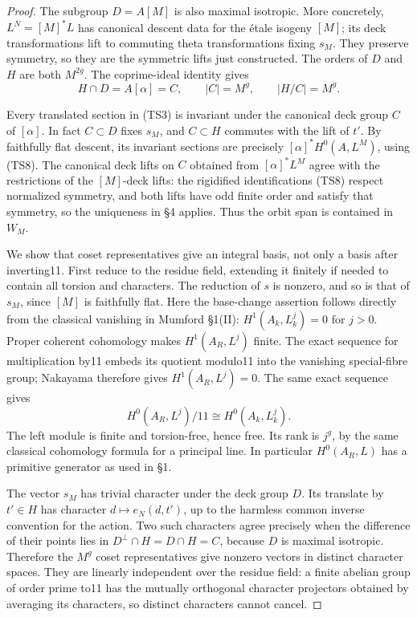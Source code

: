 \begin{proof}
The subgroup \(D=A[M]\) is also maximal isotropic. More concretely, \(L^N=[M]^*L\) has canonical descent data for the étale isogeny \([M]\); its deck transformations lift to commuting theta transformations fixing \(s_M\). They preserve symmetry, so they are the symmetric lifts just constructed. The orders of \(D\) and \(H\) are both \(M^{2g}\). The coprime-ideal identity gives \[
 H\cap D=A[\alpha]=C,\qquad |C|=M^g,
 \qquad |H/C|=M^g.
 \tag{TS10}
\]

Every translated section in (TS3) is invariant under the canonical deck group \(C\) of \([\alpha]\). In fact \(C\subset D\) fixes \(s_M\), and \(C\subset H\) commutes with the lift of \(t'\). By faithfully flat descent, its invariant sections are precisely \([\alpha]^*H^0(A,L^M)\), using (TS8). The canonical deck lifts on \(C\) obtained from \([\alpha]^*L^M\) agree with the restrictions of the \([M]\)-deck lifts: the rigidified identifications (TS8) respect normalized symmetry, and both lifts have odd finite order and satisfy that symmetry, so the uniqueness in §4 applies. Thus the orbit span is contained in \(W_M\).

We show that coset representatives give an integral basis, not only a basis after inverting11. First reduce to the residue field, extending it finitely if needed to contain all torsion and characters. The reduction of \(s\) is nonzero, and so is that of \(s_M\), since \([M]\) is faithfully flat. Here the base-change assertion follows directly from the classical vanishing in Mumford §1(II): \(H^1(A_k,L_k^j)=0\) for \(j>0\). Proper coherent cohomology makes \(H^1(A_R,L^j)\) finite. The exact sequence for multiplication by11 embeds its quotient modulo11 into the vanishing special-fibre group; Nakayama therefore gives \(H^1(A_R,L^j)=0\). The same exact sequence gives \[
 H^0(A_R,L^j)/11\cong H^0(A_k,L_k^j).
 \tag{TS11}
\] The left module is finite and torsion-free, hence free. Its rank is \(j^g\), by the same classical cohomology formula for a principal line. In particular \(H^0(A_R,L)\) has a primitive generator as used in §1.

The vector \(s_M\) has trivial character under the deck group \(D\). Its translate by \(t'\in H\) has character \(d\mapsto e_N(d,t')\), up to the harmless common inverse convention for the action. Two such characters agree precisely when the difference of their points lies in \(D^\perp\cap H=D\cap H=C\), because \(D\) is maximal isotropic. Therefore the \(M^g\) coset representatives give nonzero vectors in distinct character spaces. They are linearly independent over the residue field: a finite abelian group of order prime to11 has the mutually orthogonal character projectors obtained by averaging its characters, so distinct characters cannot cancel.


\end{proof}
